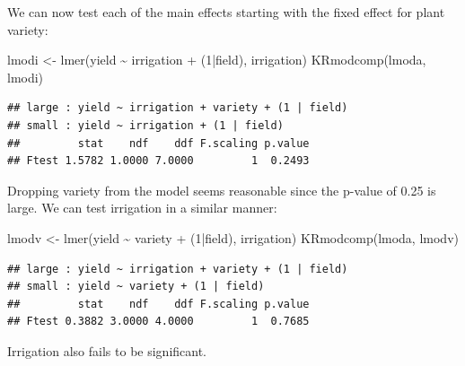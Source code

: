 \documentclass[
  ignorenonframetext,
]{beamer}
\newenvironment{Shaded}{\begin{snugshade}}{\end{snugshade}}
\newcommand{\DecValTok}[1]{\textcolor[rgb]{0.00,0.00,0.81}{#1}}
\newcommand{\FunctionTok}[1]{\textcolor[rgb]{0.00,0.00,0.00}{#1}}
\newcommand{\NormalTok}[1]{#1}
\newcommand{\OtherTok}[1]{\textcolor[rgb]{0.56,0.35,0.01}{#1}}
\newcommand{\SpecialCharTok}[1]{\textcolor[rgb]{0.00,0.00,0.00}{#1}}
\begin{document}
\begin{frame}[fragile]{}
\protect\hypertarget{section-8}{}
We can now test each of the main effects starting with the fixed effect
for plant variety:

\vspace{12pt}
\tiny

\begin{Shaded}
\begin{Highlighting}[]
\NormalTok{lmodi }\OtherTok{\textless{}{-}} \FunctionTok{lmer}\NormalTok{(yield }\SpecialCharTok{\textasciitilde{}}\NormalTok{ irrigation }\SpecialCharTok{+}\NormalTok{ (}\DecValTok{1}\SpecialCharTok{|}\NormalTok{field), irrigation)}
\FunctionTok{KRmodcomp}\NormalTok{(lmoda, lmodi)}
\end{Highlighting}
\end{Shaded}

\begin{verbatim}
## large : yield ~ irrigation + variety + (1 | field)
## small : yield ~ irrigation + (1 | field)
##         stat    ndf    ddf F.scaling p.value
## Ftest 1.5782 1.0000 7.0000         1  0.2493
\end{verbatim}

\vspace{12pt}
\normalsize

Dropping variety from the model seems reasonable since the p-value of
0.25 is large. We can test irrigation in a similar manner:

\vspace{12pt}
\tiny

\begin{Shaded}
\begin{Highlighting}[]
\NormalTok{lmodv }\OtherTok{\textless{}{-}} \FunctionTok{lmer}\NormalTok{(yield }\SpecialCharTok{\textasciitilde{}}\NormalTok{ variety }\SpecialCharTok{+}\NormalTok{ (}\DecValTok{1}\SpecialCharTok{|}\NormalTok{field), irrigation)}
\FunctionTok{KRmodcomp}\NormalTok{(lmoda, lmodv)}
\end{Highlighting}
\end{Shaded}

\begin{verbatim}
## large : yield ~ irrigation + variety + (1 | field)
## small : yield ~ variety + (1 | field)
##         stat    ndf    ddf F.scaling p.value
## Ftest 0.3882 3.0000 4.0000         1  0.7685
\end{verbatim}

\vspace{12pt}
\normalsize

Irrigation also fails to be significant.
\end{frame}
\end{document}
